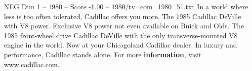 \begin{textsample}{NEG Dim 1 – 1980 – Score -1.00 – 1980/tv\_com\_1980\_51.txt}  \label{ex:f1_neg_056}
In a world where less is too often tolerated, Cadillac offers you more.
The 1985 Cadillac DeVille with V8 power.
Exclusive V8 power not even available on Buick and Olds.
The 1985 front-wheel drive Cadillac DeVille with the only transverse-mounted V8 engine in the world.
Now at your Chicagoland Cadillac dealer.
In luxury and performance, Cadillac stands alone.
For more \textbf{information}, visit www.cadillac.com.

\end{textsample}
